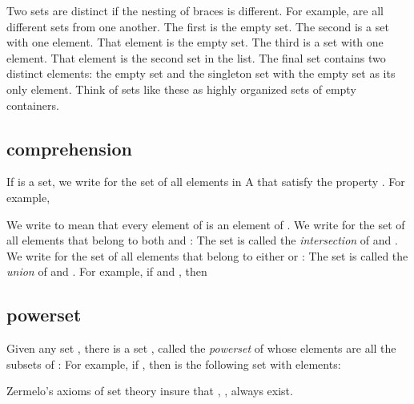 \documentclass[cup9a]{cupbook}
\begin{document}
Two sets are distinct if the nesting of braces is different.
For example,
\mc{$$
\{\},\quad \{\{\}\},\quad \{\{\{\}\}\},\quad \{\{\},\{\{\}\}\}
$$}
are all different sets from one another.  The first is the empty set.
The second is a set with one element.  That element is the empty set.
The third is a set with one element.  That element is the second set in the list.  The final set contains two distinct elements: the empty set and the singleton set with the empty set as its only element.  Think of sets like these as highly organized sets of empty containers.

\subsection{comprehension}

If  is a set, we write
for the set of all elements in A that satisfy the property .
For example,



We write  to mean that every element of  is an element of .
We write  for the set of all elements that belong to both  and :
The set  is called the {\it intersection} of  and .
We write  for the set of all elements that belong to either  or :
The set  is called the {\it union} of  and .
For example, if  and , then

\subsection{powerset}

Given any set , there is a set , called the {\it powerset} of  whose elements are  all the subsets of :
For example, if , then  is the following set with
 elements:


Zermelo's axioms of set theory insure that , ,  always exist.
\end{document}
